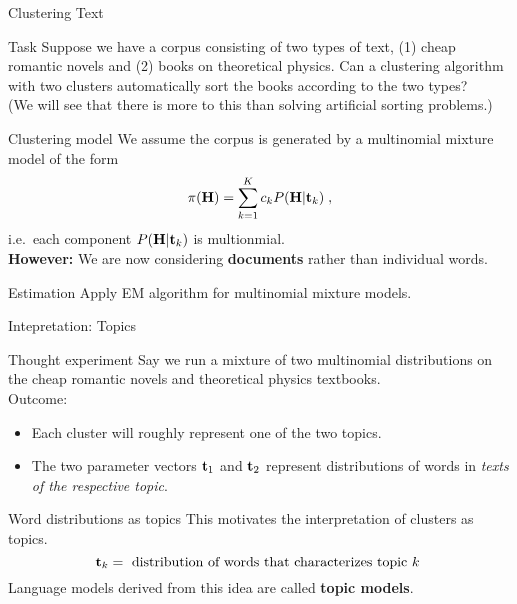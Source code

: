 \documentclass[dvipsnames,mathserif]{beamer}
\def\ie{i.e.\ }
\begin{document}
{\begin{frame}{Clustering Text}
  \begin{block}{Task}
    Suppose we have a corpus consisting of two types of text, (1)
    cheap romantic novels and 
    (2) books on theoretical physics. Can a clustering algorithm with
    two clusters
    automatically sort the books according to the two types?\\
    \vspace{2mm}
    (We will see that there is more to this than solving artificial
    sorting problems.)
  \end{block}
  \begin{block}{Clustering model}
    We assume the corpus is generated by a  multinomial mixture model
    of the form 
\vspace{-1mm}
    \begin{equation*}
      \pi(\mathbf{H})=\sum_{k=1}^K c_k P(\mathbf{H}|\mathbf{t}_k)\;,
    \end{equation*}
    \ie each component $P(\mathbf{H}|\mathbf{t}_k)$ is multionmial.\\
    \textbf{However:} We are now considering \textbf{documents} rather
    than individual words.
  \end{block}
  \begin{block}{Estimation}
    Apply EM algorithm for multinomial mixture models.
  \end{block}
\end{frame}


\begin{frame}{Intepretation: Topics}
  \begin{block}{Thought experiment}
    Say we run a mixture of two multinomial distributions on the cheap
    romantic novels and theoretical physics textbooks.\\
    \vspace{3mm}
    Outcome:
    \begin{itemize}
    \item Each cluster will roughly represent one of the two topics.
    \item The two parameter vectors $\mathbf{t}_1$ and $\mathbf{t}_2$
      represent distributions of words in \emph{texts of the
        respective topic}.
    \end{itemize}
  \end{block}
  \begin{block}{Word distributions as topics}
    This motivates the interpretation of clusters as topics.
    \begin{equation*}
      \mathbf{t}_k = \text{ distribution of words that characterizes topic
        $k$ }
    \end{equation*}
    Language models derived from this idea are called \textbf{topic models}.
  \end{block}
\end{frame}





}
\end{document}
